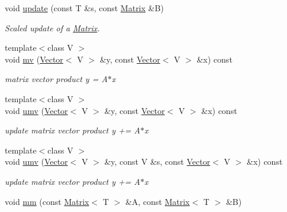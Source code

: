 \begin{DoxyCompactItemize}
void \hyperlink{classhdnum_1_1Matrix_acb2eaf3fb83498d4c7b2de964c5e53de}{update} (const T \&s, const \hyperlink{classhdnum_1_1Matrix}{Matrix} \&B)
\begin{DoxyCompactList}\small\item\em Scaled update of a \hyperlink{classhdnum_1_1Matrix}{Matrix}. \item\end{DoxyCompactList}\item 
\hypertarget{classhdnum_1_1Matrix_abd684181d36b38464d2b58827f95fec3}{
{\footnotesize template$<$class V $>$ }\\void \hyperlink{classhdnum_1_1Matrix_abd684181d36b38464d2b58827f95fec3}{mv} (\hyperlink{classhdnum_1_1Vector}{Vector}$<$ V $>$ \&y, const \hyperlink{classhdnum_1_1Vector}{Vector}$<$ V $>$ \&x) const }
\label{classhdnum_1_1Matrix_abd684181d36b38464d2b58827f95fec3}

\begin{DoxyCompactList}\small\item\em matrix vector product y = A$\ast$x \item\end{DoxyCompactList}\item 
\hypertarget{classhdnum_1_1Matrix_a907264ce1afd644a9b6ef10756b3dcd3}{
{\footnotesize template$<$class V $>$ }\\void \hyperlink{classhdnum_1_1Matrix_a907264ce1afd644a9b6ef10756b3dcd3}{umv} (\hyperlink{classhdnum_1_1Vector}{Vector}$<$ V $>$ \&y, const \hyperlink{classhdnum_1_1Vector}{Vector}$<$ V $>$ \&x) const }
\label{classhdnum_1_1Matrix_a907264ce1afd644a9b6ef10756b3dcd3}

\begin{DoxyCompactList}\small\item\em update matrix vector product y += A$\ast$x \item\end{DoxyCompactList}\item 
\hypertarget{classhdnum_1_1Matrix_a7eee0aa57c0ea42edc1419031887364a}{
{\footnotesize template$<$class V $>$ }\\void \hyperlink{classhdnum_1_1Matrix_a7eee0aa57c0ea42edc1419031887364a}{umv} (\hyperlink{classhdnum_1_1Vector}{Vector}$<$ V $>$ \&y, const V \&s, const \hyperlink{classhdnum_1_1Vector}{Vector}$<$ V $>$ \&x) const }
\label{classhdnum_1_1Matrix_a7eee0aa57c0ea42edc1419031887364a}

\begin{DoxyCompactList}\small\item\em update matrix vector product y += A$\ast$x \item\end{DoxyCompactList}\item 
\hypertarget{classhdnum_1_1Matrix_a42d98f6f42d831ee37c602951503a808}{
void \hyperlink{classhdnum_1_1Matrix_a42d98f6f42d831ee37c602951503a808}{mm} (const \hyperlink{classhdnum_1_1Matrix}{Matrix}$<$ T $>$ \&A, const \hyperlink{classhdnum_1_1Matrix}{Matrix}$<$ T $>$ \&B)}
\label{classhdnum_1_1Matrix_a42d98f6f42d831ee37c602951503a808}


\end{DoxyCompactItemize}
